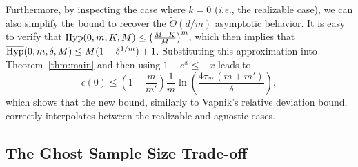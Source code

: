 \documentclass[twoside,11pt]{article}
\newcommand{\ie}{\emph{i.e.\xspace}}
\newcommand{\pr}[1]{\left(#1\right)}
\renewcommand{\H}{{\mathcal{H}}}
\newcommand{\eqdef}{\overset{\smash{\mbox{\tiny \rm def}}}{=}}
\newcommand{\Hyp}{\textnormal{Hyp}}
\newcommand{\HypInv}{\overline{\textnormal{Hyp}}}
\begin{document}
Furthermore, by inspecting the case where $k=0$ (\ie, the realizable case), we can also simplify the bound to recover the $\widetilde{\Theta}(d/m)$ asymptotic behavior.
It is easy to verify that $\Hyp(0, m, K, M) \le \pr{\frac{M-K}{M}}^m$, which then implies that $\HypInv(0,m,\delta,M) \le M(1-\delta^{1/m})+1$.
Substituting this approximation into Theorem~\ref{thm:main} and then using $1-e^x \le -x$ leads to
\begin{equation*}
    \epsilon(0) \le \pr{1 + \frac{m}{m'}} \frac{1}{m} \ln\pr{ \frac{4\tau_\H(m+m')}{\delta}},
\end{equation*}
which shows that the new bound, similarly to Vapnik's relative deviation bound, correctly interpolates between the realizable and agnostic cases.
















\subsection{The Ghost Sample Size Trade-off}
\label{ssec:ghost_sample_size_trade-off}
\end{document}
